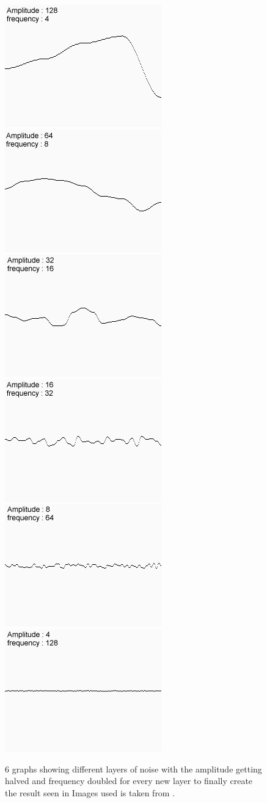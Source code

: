\begin{figure}[H]
	\includegraphics[width=0.32\linewidth]{img/noise_a}
	\includegraphics[width=0.32\linewidth]{img/noise_b}
	\includegraphics[width=0.32\linewidth]{img/noise_c}
	\includegraphics[width=0.32\linewidth]{img/noise_d}
	\includegraphics[width=0.32\linewidth]{img/noise_e}
	\includegraphics[width=0.32\linewidth]{img/noise_f}
	\centering
	\caption{6 graphs showing different layers of noise with the amplitude getting halved and frequency doubled for every new layer to finally create the result seen in  Images used is taken from \cite{perlinnoise2}.}
	\label{fig:1DNoise}
\end{figure}
